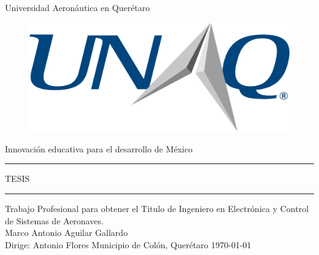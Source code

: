 \begin{titlepage}
	\begin{center}
		{\Huge Universidad Aeronáutica en Querétaro}
		\vspace{1cm}
		\begin{figure}[h]
			\centering
			\includegraphics[scale=0.5]{Portada/Logo.eps}
		\end{figure}
		\vspace{1cm}
		{\large Innovación educativa para el desarrollo de México}
		\vspace{0.5cm}
		\rule{150mm}{0.5mm}
		\vspace{2mm}
		{\huge TESIS}
		\vspace{2mm}
		\rule{150mm}{0.5mm}
		\vspace{1cm}
		\large Trabajo Profesional para obtener el Titulo de Ingeniero en Electrónica y Control de Sistemas de Aeronaves.
		\\
		\vspace{1cm}
		\Large Marco Antonio Aguilar Gallardo
		\\
		\vspace{1cm}
		\Large Dirige: Antonio Flores 
		\vfill
		\Large Municipio de Colón, Querétaro \hfill \today
		
		
	\end{center}

	\tableofcontents
\listoffigures
\listoftables
\clearpage

\end{titlepage}
